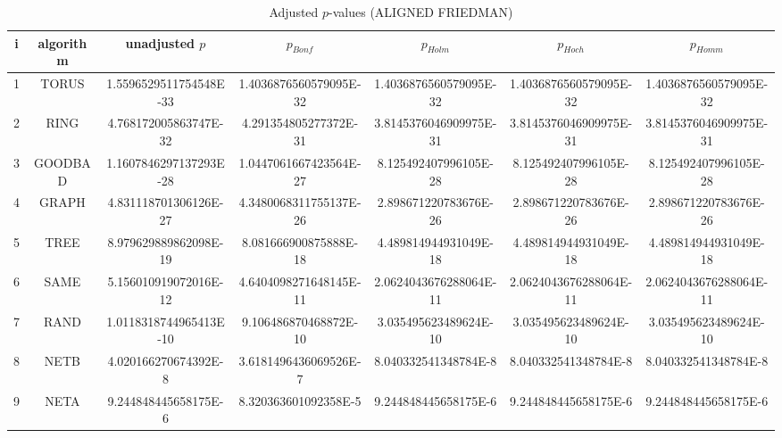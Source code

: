\documentclass[a4paper,10pt]{article}
\begin{document}
\begin{landscape}
\begin{table}[!htp]
\centering\scriptsize
\caption{Adjusted $p$-values (ALIGNED FRIEDMAN)}
\begin{tabular}{ccccccc}
i&algorithm&unadjusted $p$&$p_{Bonf}$&$p_{Holm}$&$p_{Hoch}$&$p_{Homm}$\\
\hline
1& TORUS&1.5596529511754548E-33&1.4036876560579095E-32&1.4036876560579095E-32&1.4036876560579095E-32&1.4036876560579095E-32\\
2& RING&4.768172005863747E-32&4.291354805277372E-31&3.8145376046909975E-31&3.8145376046909975E-31&3.8145376046909975E-31\\
3& GOODBAD&1.1607846297137293E-28&1.0447061667423564E-27&8.125492407996105E-28&8.125492407996105E-28&8.125492407996105E-28\\
4& GRAPH&4.831118701306126E-27&4.3480068311755137E-26&2.898671220783676E-26&2.898671220783676E-26&2.898671220783676E-26\\
5& TREE&8.979629889862098E-19&8.081666900875888E-18&4.489814944931049E-18&4.489814944931049E-18&4.489814944931049E-18\\
6& SAME&5.156010919072016E-12&4.6404098271648145E-11&2.0624043676288064E-11&2.0624043676288064E-11&2.0624043676288064E-11\\
7& RAND&1.0118318744965413E-10&9.106486870468872E-10&3.035495623489624E-10&3.035495623489624E-10&3.035495623489624E-10\\
8& NETB&4.020166270674392E-8&3.6181496436069526E-7&8.040332541348784E-8&8.040332541348784E-8&8.040332541348784E-8\\
9& NETA&9.244848445658175E-6&8.320363601092358E-5&9.244848445658175E-6&9.244848445658175E-6&9.244848445658175E-6\\
\hline
\end{tabular}
\end{table}


\end{landscape}
\end{document}

